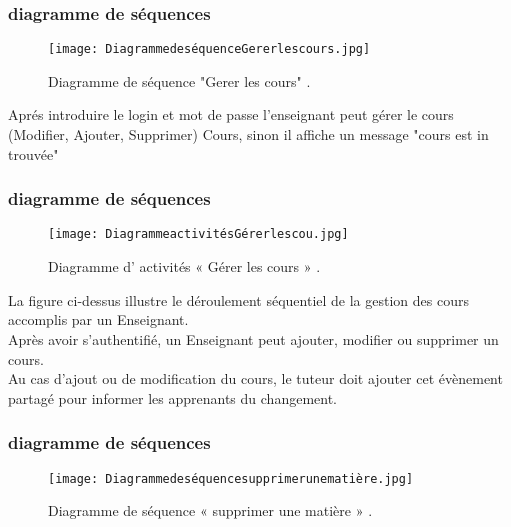 \subsubsection{diagramme de séquences }
\begin{figure}[ht]
	\centering
	\texttt{[image: DiagrammedeséquenceGererlescours.jpg]}
	\caption{Diagramme de séquence "Gerer les cours" .}
	\label{fig:Diagramme de séquence "Gerer les cours"  }
\end{figure}
\FloatBarrier

Aprés introduire le login et mot de passe l’enseignant peut gérer le cours (Modifier, Ajouter,
Supprimer) Cours, sinon il affiche un message "cours est in trouvée"


\subsubsection{diagramme de séquences }
\begin{figure}[ht]
	\centering
	\texttt{[image: DiagrammeactivitésGérerlescou.jpg]}
	\caption{Diagramme d' activités « Gérer les cours » .}
	\label{fig:Diagramme d' activités  Gérer les cours  }
\end{figure}
\FloatBarrier

La figure ci-dessus illustre le déroulement séquentiel de la gestion des cours accomplis par un Enseignant.\\
Après avoir s’authentifié, un Enseignant peut ajouter, modifier ou supprimer un cours.\\
 Au cas d’ajout ou de modification du cours, le tuteur doit ajouter cet évènement  partagé pour informer les apprenants du changement.






\subsubsection{diagramme de séquences }
\begin{figure}[ht]
	\centering
	\texttt{[image: Diagrammedeséquencesupprimerunematière.jpg]}
	\caption{ Diagramme de séquence « supprimer une matière » .}
	\label{fig: Diagramme de séquence  supprimer une matière   }
\end{figure}
\FloatBarrier

